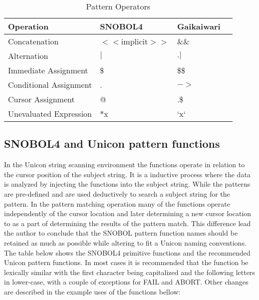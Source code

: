 \documentclass{article}
\begin{document}
\begin{table}[ht]
	\caption{Pattern Operators}
	\centering
	\begin{tabular}{|l|l|l|l|}
		\hline\hline
		Operation & SNOBOL4 & Gaikaiwari \\
		\hline
		Concatenation & $<<$implicit$>>$ & \&\& \\
		Alternation & $|$ & $.|$ \\
		\hline
		Immediate Assignment & \$ & \$\$ \\
		Conditional Assignment & . & $->$ \\
		Cursor Assignment & @ & .\$ \\
		\hline
		Unevaluated Expression & $*$x & `x` \\
		\hline
	\end{tabular}
\end{table}
\pagebreak
\subsection{SNOBOL4 and Unicon pattern functions}

In the Unicon string scanning environment the functions operate in relation to the cursor position of the subject string.  It is a inductive process where the data is analyzed by injecting the functions into the subject string.  While the patterns are pre-defined and are used deductively to search a subject string for the pattern.  In the pattern matching operation many of the functions operate independently of the cursor location and later determining a new cursor location to as a part of determining the results of the pattern match.  This difference lead the author to conclude that the SNOBOL pattern function names should be retained as much as possible while altering to fit a Unicon naming conventions.  The table below shows the SNOBOL4 primitive functions and the recommended Unicon pattern functions.  In most cases it is recommended that the function be lexically similar with the first character being capitalized and the following letters in lower-case, with a couple of exceptions for FAIL and ABORT.  Other changes are described in the example uses of the functions bellow: 
\end{document}
